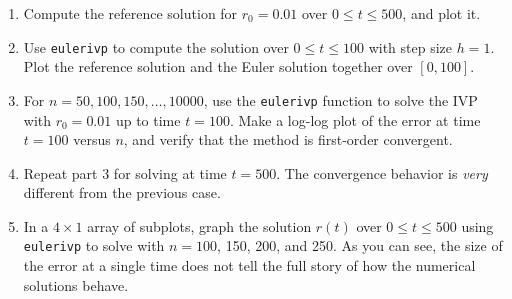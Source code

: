 \documentclass[twoside]{fncextra}
\begin{document}
\begin{enumerate}
  \item Compute the reference solution for $r_0=0.01$ over $0\le t\le 500$, and plot it. 
  \item Use \texttt{eulerivp} to compute the solution over $0\le t \le 100$ with step size $h=1$. Plot the reference solution and the Euler solution together over $[0,100]$.
  \item For $n = 50,100,150,\ldots,10000$, use the \texttt{eulerivp} function to solve the IVP with $r_0=0.01$ up to time $t=100$. Make a log-log plot of the error at time $t=100$ versus $n$, and verify that the method is first-order convergent.
  \item Repeat part 3 for solving at time $t=500$. The convergence behavior is \emph{very} different from the previous case.
  \item In a $4\times 1$ array of subplots, graph the solution $r(t)$ over $0\le t \le 500$ using \texttt{eulerivp} to solve with $n=100$, 150, 200, and 250. As you can see, the size of the error at a single time does not tell the full story of how the numerical solutions behave.
\end{enumerate}
\end{document}
